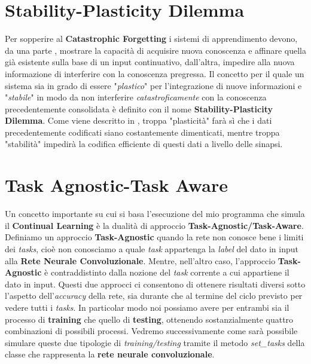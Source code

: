 \section{Stability-Plasticity Dilemma}
Per sopperire al \textbf{Catastrophic Forgetting} i sistemi di apprendimento devono, da una parte , mostrare la capacità di acquisire nuova conoscenza e affinare quella già esistente sulla base di un input continuativo, dall'altra, impedire alla nuova informazione di interferire con la conoscenza pregressa.
Il concetto  per il quale un sistema sia in grado di essere "\textit{plastico}" per l'integrazione di nuove informazioni e "\textit{stabile}"
in modo da non interferire \textit{catastroficamente} con la conoscenza precedentemente consolidata è definito con il nome \textbf{Stability-Plasticity Dilemma}.\newline
Come viene descritto in \cite{stability/plasticity} , troppa "plasticità" farà sì che i dati precedentemente codificati siano costantemente dimenticati, mentre troppa "stabilità" impedirà la codifica efficiente di questi dati a livello delle sinapsi.
\section{Task Agnostic-Task Aware}
Un concetto importante su cui si basa l'esecuzione del mio programma che simula il \textbf{Continual Learning} è la dualità di approccio \textbf{Task-Agnostic/Task-Aware}.
Definiamo un approccio \textbf{Task-Agnostic} quando la rete non conosce bene i limiti dei \textit{tasks}, cioè non conosciamo a quale \textit{task} appartenga la \textit{label} del dato in input alla \textbf{Rete Neurale Convoluzionale}. Mentre, nell'altro caso, l'approccio  \textbf{Task-Agnostic} è contraddistinto dalla nozione del \textit{task} corrente a cui appartiene il dato in input.\newline
Questi due approcci ci consentono di ottenere risultati diversi sotto l'aspetto dell'\textit{accuracy} della rete, sia durante che al termine del ciclo previsto per vedere tutti i \textit{tasks}. In particolar modo noi possiamo avere per entrambi sia il processo di \textbf{training} che quello di \textbf{testing}, ottenendo sostanzialmente quattro combinazioni di possibili processi.\newline
Vedremo successivamente come sarà possibile simulare queste due tipologie di \textit{training/testing} tramite il metodo \textit{set\_tasks} della classe che rappresenta la 
\textbf{rete neurale convoluzionale}.

